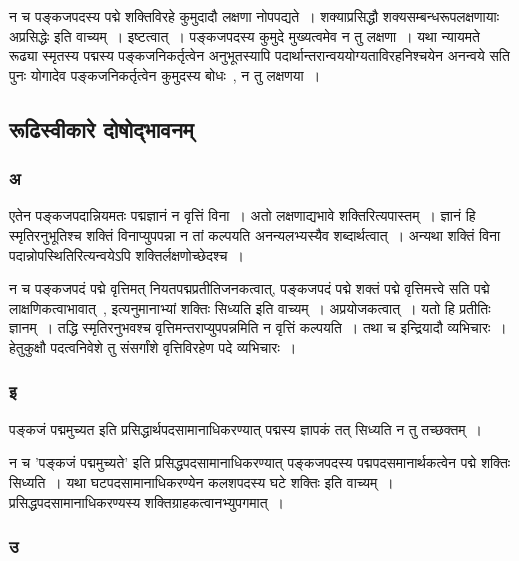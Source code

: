 				न च पङ्कजपदस्य पद्मे शक्तिविरहे कुमुदादौ लक्षणा नोपपद्यते~।  शक्याप्रसिद्धौ शक्यसम्बन्धरूपलक्षणायाः अप्रसिद्धेः इति वाच्यम्~। इष्टत्वात्~।  पङ्कजपदस्य कुमुदे मुख्यत्वमेव न तु लक्षणा~।  यथा न्यायमते रूढ्या स्मृतस्य पद्मस्य पङ्कजनिकर्तृत्वेन  अनुभूतस्यापि पदार्थान्तरान्वययोग्यताविरहनिश्चयेन अनन्वये सति पुनः योगादेव पङ्कजनिकर्तृत्वेन कुमुदस्य बोधः~, न तु लक्षणया~। 
		
		\subsection{रूढिस्वीकारे दोषोद्भावनम्}
					
			\subsubsection{अ}
			
				\begin{small}
				
					एतेन पङ्कजपदान्नियमतः पद्मज्ञानं न वृत्तिं विना~। अतो लक्षणाद्यभावे शक्तिरित्यपास्तम्~। ज्ञानं हि स्मृतिरनुभूतिश्च शक्तिं विनाप्युपपन्ना न तां कल्पयति अनन्यलभ्यस्यैव शब्दार्थत्वात्~। अन्यथा शक्तिं विना पदान्नोपस्थितिरित्यन्वयेऽपि शक्तिर्लक्षणोच्छेदश्च~। 
				\end{small}
					
					न च पङ्कजपदं पद्मे वृत्तिमत् नियतपद्मप्रतीतिजनकत्वात्, पङ्कजपदं  पद्मे शक्तं पद्मे वृत्तिमत्त्वे सति पद्मे लाक्षणिकत्वाभावात्~, इत्यनुमानाभ्यां शक्तिः सिध्यति इति वाच्यम्~। अप्रयोजकत्वात्~।  यतो हि प्रतीतिः ज्ञानम्~।  तद्धि स्मृतिरनुभवश्च वृत्तिमन्तराप्युपपन्नमिति  न वृत्तिं कल्पयति~।  तथा च इन्द्रियादौ व्यभिचारः~। हेतुकुक्षौ  पदत्वनिवेशे तु संसर्गांशे वृत्तिविरहेण पदे व्यभिचारः~।

			\subsubsection{इ}
			
				\begin{small}
				
					पङ्कजं पद्ममुच्यत इति प्रसिद्धार्थपदसामानाधिकरण्यात् पद्मस्य ज्ञापकं तत् सिध्यति न तु तच्छक्तम्~। 
				\end{small}
			
				 न च ’पङ्कजं पद्ममुच्यते’  इति प्रसिद्धपदसामानाधिकरण्यात् पङ्कजपदस्य पद्मपदसमानार्थकत्वेन  पद्मे शक्तिः सिध्यति~। यथा घटपदसामानाधिकरण्येन कलशपदस्य घटे शक्तिः इति वाच्यम्~। प्रसिद्धपदसामानाधिकरण्यस्य शक्तिग्राहकत्वानभ्युपगमात्~। 

			\subsubsection{उ}
			
